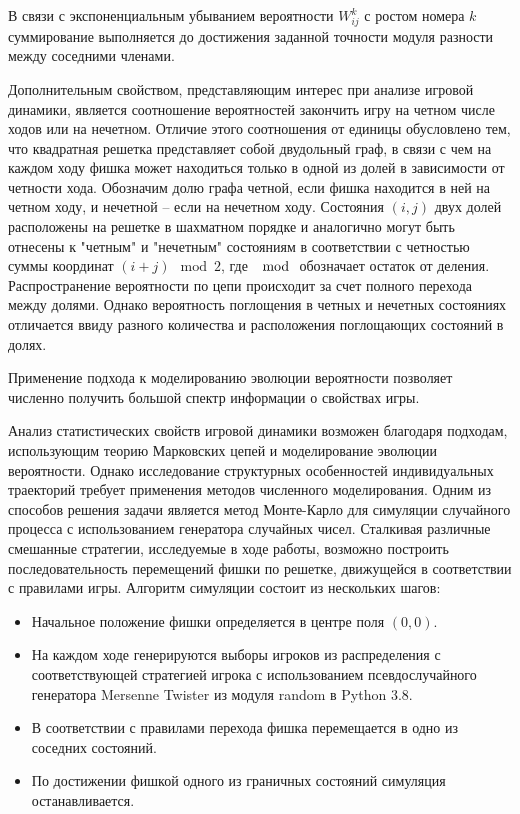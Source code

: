 В связи с экспоненциальным убыванием вероятности $W_{ij}^{k}$ с ростом номера $k$ суммирование выполняется до достижения заданной точности модуля разности между соседними членами.

Дополнительным свойством, представляющим интерес при анализе игровой динамики, является соотношение вероятностей закончить игру на четном числе ходов или на нечетном. Отличие этого соотношения от единицы обусловлено тем, что квадратная решетка представляет собой двудольный граф, в связи с чем на каждом ходу фишка может находиться только в одной из долей в зависимости от четности хода. Обозначим долю графа четной, если фишка находится в ней на четном ходу, и нечетной -- если на нечетном ходу. Состояния $(i, j)$ двух долей расположены на решетке в шахматном порядке и аналогично могут быть отнесены к "четным" и "нечетным" состояниям в соответствии с четностью суммы координат $(i + j)\mod 2$, где $\mod$ обозначает остаток от деления. Распространение вероятности по цепи происходит за счет полного перехода между долями. Однако вероятность поглощения в четных и нечетных состояниях отличается ввиду разного количества и расположения поглощающих состояний в долях.

Применение подхода к моделированию эволюции вероятности позволяет численно получить большой спектр информации о свойствах игры.

Анализ статистических свойств игровой динамики возможен благодаря подходам, использующим теорию Марковских цепей и моделирование эволюции вероятности. Однако исследование структурных особенностей индивидуальных траекторий требует применения методов численного моделирования. Одним из способов решения задачи является метод Монте-Карло для симуляции случайного процесса с использованием генератора случайных чисел. Сталкивая различные смешанные стратегии, исследуемые в ходе работы, возможно построить последовательность перемещений фишки по решетке, движущейся в соответствии с правилами игры. Алгоритм симуляции состоит из нескольких шагов:
\begin{itemize}
\item Начальное положение фишки определяется в центре поля $(0, 0)$. 
\item На каждом ходе генерируются выборы игроков из распределения с соответствующей стратегией игрока с использованием псевдослучайного генератора Mersenne Twister \cite{matsumoto_mersenne_1998} из модуля random в Python 3.8.
\item В соответствии с правилами перехода фишка перемещается в одно из соседних состояний.
\item По достижении фишкой одного из граничных состояний симуляция останавливается.
\end{itemize}

